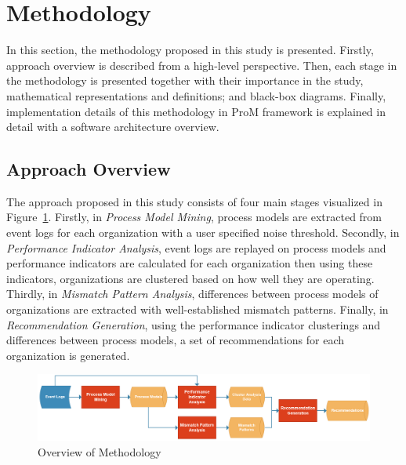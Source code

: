 \section{Methodology}
\label{sec:methodology}
In this section, the methodology proposed in this study is presented. Firstly, approach overview is described from a high-level perspective. Then, each stage in the methodology is presented together with their importance in the study, mathematical representations and definitions; and black-box diagrams. Finally, implementation details of this methodology in ProM framework is explained in detail with a software architecture overview.

\subsection{Approach Overview}
\label{subsec:approach-overview}
The approach proposed in this study consists of four main stages visualized in Figure~\ref{fig:approach-overview}. Firstly, in \textit{Process Model Mining}, process models are extracted from event logs for each organization with a user specified noise threshold. Secondly, in \textit{Performance Indicator Analysis}, event logs are replayed on process models and performance indicators are calculated for each organization then using these indicators, organizations are clustered based on how well they are operating. Thirdly, in \textit{Mismatch Pattern Analysis}, differences between process models of organizations are extracted with well-established mismatch patterns. Finally, in \textit{Recommendation Generation}, using the performance indicator clusterings and differences between process models, a set of recommendations for each organization is generated.
\begin{figure}
  \centering
  \includegraphics[width=\textwidth]{4_methodology/approach-overview}
  \caption{Overview of Methodology}
  \label{fig:approach-overview}
\end{figure}

